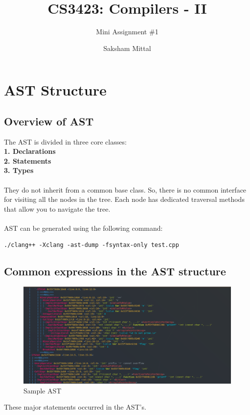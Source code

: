 \documentclass{article}
\title{CS3423: Compilers - II}
\author{Mini Assignment \#1}
\date{Saksham Mittal}
\begin{document}
\maketitle

\tableofcontents

\section{AST Structure}
\subsection{Overview of AST}
The AST is divided in three core classes: \\
\textbf{1. Declarations} \\
\textbf{2. Statements} \\
\textbf{3. Types} \\
\\
They do not inherit from a common base class. So, there is no common interface for visiting all the nodes in the tree. Each node has dedicated traversal methods that allow you to navigate the tree.\\
\\
AST can be generated using the following command:
\begin{verbatim}
./clang++ -Xclang -ast-dump -fsyntax-only test.cpp
\end{verbatim}

\subsection{Common expressions in the AST structure}
\begin{figure}[h!]
\centering
\includegraphics[scale=0.3]{AST.png}
\caption{Sample AST}
\label{fig:AST Example}
\end{figure}

These major statements occurred in the AST's.
\end{document}

